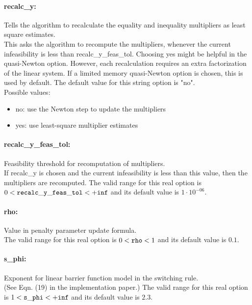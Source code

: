 \paragraph{recalc\_y:}\label{opt:recalc_y} Tells the algorithm to recalculate the equality and inequality multipliers as least square estimates. \\
 This asks the algorithm to recompute the multipliers, whenever the current infeasibility is less than recalc\_y\_feas\_tol. Choosing yes might be helpful in the quasi-Newton option.  However, each recalculation requires an extra factorization of the linear system.  If a limited memory quasi-Newton option is chosen, this is used by default. The default value for this string option is "no".
\\ 
Possible values:
\begin{itemize}
   \item no: use the Newton step to update the multipliers
   \item yes: use least-square multiplier estimates
\end{itemize}

\paragraph{recalc\_y\_feas\_tol:}\label{opt:recalc_y_feas_tol} Feasibility threshold for recomputation of multipliers. \\
 If recalc\_y is chosen and the current infeasibility is less than this value, then the multipliers are recomputed. The valid range for this real option is 
$0 <  {\tt recalc\_y\_feas\_tol } <  {\tt +inf}$
and its default value is $1 \cdot 10^{-06}$.


\paragraph{rho:}\label{opt:rho} Value in penalty parameter update formula. \\
 The valid range for this real option is 
$0 <  {\tt rho } <  1$
and its default value is $0.1$.


\paragraph{s\_phi:}\label{opt:s_phi} Exponent for linear barrier function model in the switching rule. \\
 (See Eqn. (19) in the implementation paper.) The valid range for this real option is 
$1 <  {\tt s\_phi } <  {\tt +inf}$
and its default value is $2.3$.


